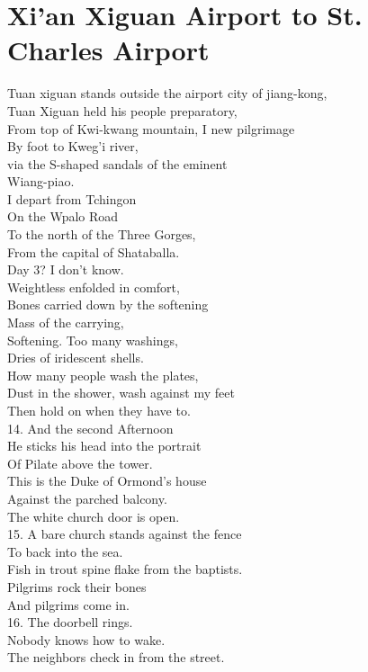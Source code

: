 \documentclass[smalldemyvopaper,11pt,twoside,onecolumn,openright,extrafontsizes]{memoir}
\begin{document}
\chapter{Xi'an Xiguan Airport to St. Charles Airport}
Tuan xiguan stands outside the airport city of jiang-kong,
\\Tuan Xiguan held his people preparatory,
\\From top of Kwi-kwang mountain, I new pilgrimage
\\By foot to Kweg'i river,
\\via the S-shaped sandals of the eminent
\\Wiang-piao.
\\I depart from Tchingon
\\On the Wpalo Road
\\To the north of the Three Gorges,
\\From the capital of Shataballa.
\\Day 3? I don't know.
\\Weightless enfolded in comfort,
\\Bones carried down by the softening
\\Mass of the carrying,
\\Softening. Too many washings,
\\Dries of iridescent shells.
\\How many people wash the plates,
\\Dust in the shower, wash against my feet
\\Then hold on when they have to.
\\14. And the second Afternoon
\\He sticks his head into the portrait
\\Of Pilate above the tower.
\\This is the Duke of Ormond's house
\\Against the parched balcony.
\\The white church door is open.
\\15. A bare church stands against the fence
\\To back into the sea.
\\Fish in trout spine flake from the baptists.
\\Pilgrims rock their bones
\\And pilgrims come in.
\\16. The doorbell rings.
\\Nobody knows how to wake.
\\The neighbors check in from the street.
\end{document}
